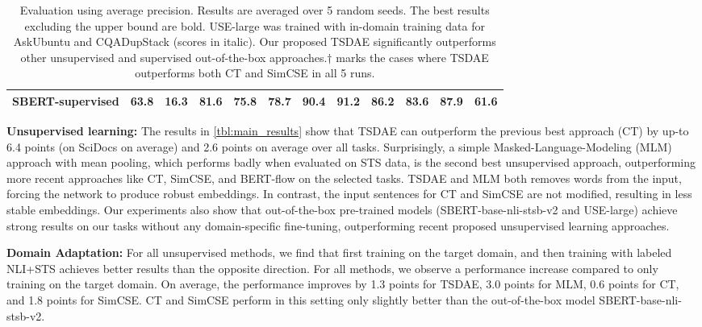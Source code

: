\documentclass[11pt]{article}
\begin{document}
\begin{table*}[t]
{\begin{tabular}{|l|c|c|ccc|ccccc|c|}
\hline
SBERT-supervised  & 63.8                               & 16.3                   & 81.6                   & 75.8                   & 78.7                      & 90.4           & 91.2           & 86.2                           & 83.6           & 87.9                      & 61.6                   \\
\hline
\end{tabular}}
\caption{Evaluation using average precision. Results are averaged over 5 random seeds. The best results excluding the upper bound are bold. USE-large was trained with in-domain training data for AskUbuntu and CQADupStack (scores in italic). Our proposed TSDAE significantly outperforms other unsupervised and supervised out-of-the-box approaches.$\dagger$ marks the cases where TSDAE outperforms both CT and SimCSE in all 5 runs.}
\label{tbl:main_results}
\end{table*}



\textbf{Unsupervised learning:} The results in \autoref{tbl:main_results} show that TSDAE can outperform the previous best approach (CT) by up-to 6.4 points (on SciDocs on average) and 2.6 points on average over all tasks. Surprisingly, a simple Masked-Language-Modeling (MLM) approach with mean pooling, which performs badly when evaluated on STS data, is the second best unsupervised approach, outperforming more recent approaches like CT, SimCSE, and BERT-flow on the selected tasks. TSDAE and MLM both removes words from the input, forcing the network to produce robust embeddings. In contrast, the input sentences for CT and SimCSE are not modified, resulting in less stable embeddings. Our experiments also show that out-of-the-box pre-trained models (SBERT-base-nli-stsb-v2 and USE-large) achieve strong results on our tasks without any domain-specific fine-tuning, outperforming recent proposed unsupervised learning approaches. 


\textbf{Domain Adaptation:} For all unsupervised methods, we find that first training on the target domain, and then training with labeled NLI+STS achieves better results than the opposite direction.  For all methods, we observe a performance increase compared to only training on the target domain. On average, the performance improves by 1.3 points for TSDAE, 3.0 points for MLM, 0.6 points for CT, and 1.8 points for SimCSE. CT and SimCSE perform in this setting only slightly better than the out-of-the-box model SBERT-base-nli-stsb-v2.
\end{document}
